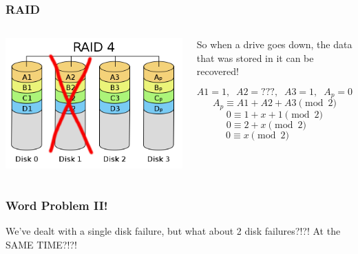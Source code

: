 \documentclass{beamer}
\theoremstyle{mystyle}
\begin{document}
\begin{frame}
\frametitle{RAID}

\begin{columns}
		\begin{center}
			\vspace{-1in}
			\includegraphics[scale=0.15]{disk1}	
		\end{center}
		\begin{center}
			So when a drive goes down, the data that was stored in it can be recovered! 
		
			\[A1 = 1, \; \; A2 = ???, \; \; A3 = 1, \;\; A_p =  0\]
		    \pause \[ A_p \equiv A1 + A2 + A3 \pmod 2 \]
		    \vspace*{-\baselineskip}\pause\[ 0 \equiv 1 + x + 1 \pmod2 \]
		    \vspace*{-\baselineskip}\pause\[ \; 0 \equiv 2 + x \pmod 2 \quad \quad \]
		   \vspace*{-\baselineskip} \pause \[ 0 \equiv x \pmod 2 \quad \quad \quad \;\; \]
		\end{center}
\end{columns}
 
\end{frame}

\begin{frame}
\frametitle{Word Problem II!}

	\begin{center}
		We've dealt with a single disk failure, but what about 2 disk failures?!?! At the SAME TIME?!?!
	\end{center}
	
\end{frame}
\end{document}

